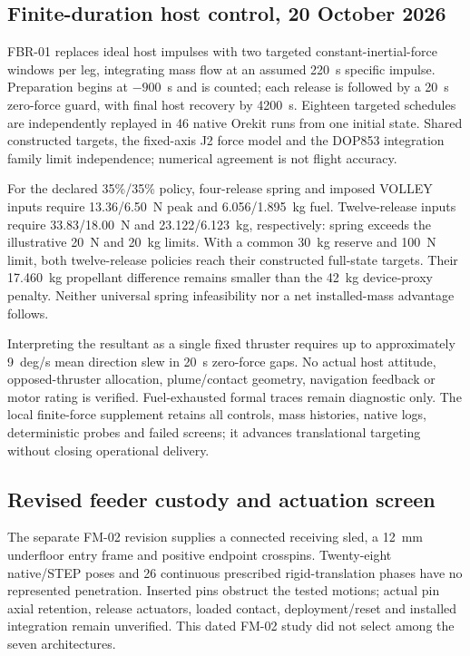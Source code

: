 \documentclass[conference]{IEEEtran}
\begin{document}
\subsection{Finite-duration host control, 20 October 2026}
FBR-01 replaces ideal host impulses with two targeted constant-inertial-force windows per leg, integrating mass flow at an assumed 220~s specific impulse. Preparation begins at $-900$~s and is counted; each release is followed by a 20~s zero-force guard, with final host recovery by 4200~s. Eighteen targeted schedules are independently replayed in 46 native Orekit runs from one initial state. Shared constructed targets, the fixed-axis J2 force model and the DOP853 integration family limit independence; numerical agreement is not flight accuracy.

For the declared 35\%/35\% policy, four-release spring and imposed VOLLEY inputs require 13.36/6.50~N peak and 6.056/1.895~kg fuel. Twelve-release inputs require 33.83/18.00~N and 23.122/6.123~kg, respectively: spring exceeds the illustrative 20~N and 20~kg limits. With a common 30~kg reserve and 100~N limit, both twelve-release policies reach their constructed full-state targets. Their 17.460~kg propellant difference remains smaller than the 42~kg device-proxy penalty. Neither universal spring infeasibility nor a net installed-mass advantage follows.

Interpreting the resultant as a single fixed thruster requires up to approximately 9~deg/s mean direction slew in 20~s zero-force gaps. No actual host attitude, opposed-thruster allocation, plume/contact geometry, navigation feedback or motor rating is verified. Fuel-exhausted formal traces remain diagnostic only. The local finite-force supplement retains all controls, mass histories, native logs, deterministic probes and failed screens; it advances translational targeting without closing operational delivery.

\subsection{Revised feeder custody and actuation screen}
The separate FM-02 revision supplies a connected receiving sled, a 12~mm underfloor entry frame and positive endpoint crosspins. Twenty-eight native/STEP poses and 26 continuous prescribed rigid-translation phases have no represented penetration. Inserted pins obstruct the tested motions; actual pin axial retention, release actuators, loaded contact, deployment/reset and installed integration remain unverified. This dated FM-02 study did not select among the seven architectures.
\end{document}
